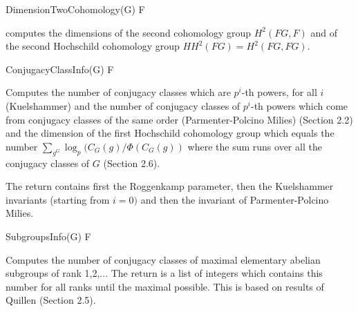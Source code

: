 \> DimensionTwoCohomology(G) F

computes the dimensions of the second cohomology group $H^2(FG, F)$ and of the second
Hochschild cohomology group $HH^2(FG) = H^2(FG, FG)$.

\> ConjugacyClassInfo(G) F

Computes the number of conjugacy classes which are $p^i$-th powers, for all $i$ (Kuelshammer) and
the number of conjugacy classes of $p^i$-th powers which come from conjugacy classes of the same order
 (Parmenter-Polcino Milies) \cite{HS06}(Section 2.2) and the dimension of the first Hochschild 
 cohomology group which equals the number $\sum_{g^G} \log_p(C_G(g)/\Phi(C_G(g))$ where the sum runs over
 all the conjugacy classes of $G$ \cite{HS06}(Section 2.6). 
 
 The return contains first the Roggenkamp parameter, then the Kuelshammer invariants (starting from $i = 0)$ and then the invariant of Parmenter-Polcino Milies.
 
\> SubgroupsInfo(G) F

Computes the number of conjugacy classes of maximal elementary abelian subgroups of rank 1,2,...
The return is a list of integers which contains this number for all ranks until the maximal possible.
This is based on results of Quillen \cite{HS06}(Section 2.5).


